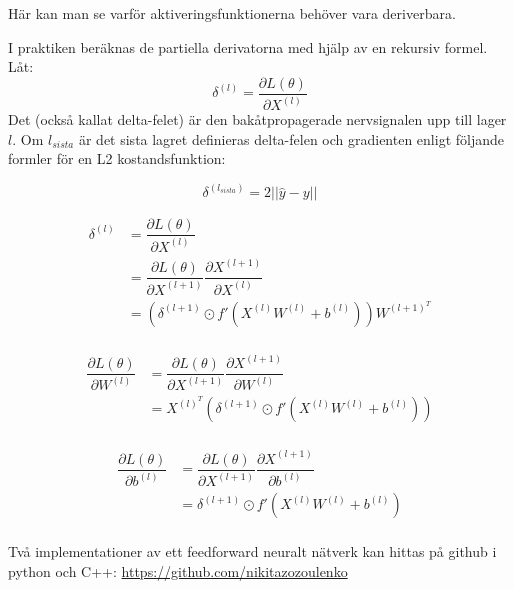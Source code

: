 \documentclass[a4paper,11pt,twoside]{article}
\newcommand*{\pd}[2]{\ensuremath{\dfrac{\partial #1}{\partial #2}}}
\begin{document}
Här kan man se varför aktiveringsfunktionerna behöver vara deriverbara.

I praktiken beräknas de partiella derivatorna med hjälp av en rekursiv formel. Låt: \cite{cs231n} \cite{wikiStanford} \cite{convmath}
\begin{equation}
\delta^{(l)} = \pd{L(\theta)}{X^{(l)}}
\end{equation}
Det (också kallat delta-felet) är den bakåtpropagerade nervsignalen upp till lager $l$. Om $l_{sista}$ är det sista lagret definieras delta-felen och gradienten enligt följande formler för en L2 kostandsfunktion: \cite{cs231n} \cite{wikiStanford} \cite{convmath}

\begin{equation}
\delta^{(l_{sista})} = 2 ||\hat{y}-y||
\end{equation}

\begin{equation}
\begin{split}
\delta^{(l)} 
	& = \pd{L(\theta)}{X^{(l)}} \\
	& = \pd{L(\theta)}{X^{(l+1)}} \pd{X^{(l+1)}}{X^{(l)}}\\
	& = \left( \delta^{(l+1)} \odot f'(X^{(l)}W^{(l)}+b^{(l)}) \right) W^{(l+1)^T}\\
\end{split}
\end{equation}

\begin{equation}
\begin{split}
\pd{L(\theta)}{W^{(l)}}
	& = \pd{L(\theta)}{X^{(l+1)}} \pd{X^{(l+1)}}{W^{(l)}}\\
	& = X^{(l)^T} \left( \delta^{(l+1)} \odot f'(X^{(l)} W^{(l)}+b^{(l)}) \right) \\
\end{split}
\end{equation}

\begin{equation}
\begin{split}
\pd{L(\theta)}{b^{(l)}}
	& = \pd{L(\theta)}{X^{(l+1)}} \pd{X^{(l+1)}}{b^{(l)}}\\
	& =  \delta^{(l+1)} \odot f'(X^{(l)} W^{(l)}+b^{(l)})  \\
\end{split}
\end{equation}

Två implementationer av ett feedforward neuralt nätverk kan hittas på github i python och C++: \url{https://github.com/nikitazozoulenko}
\end{document}

